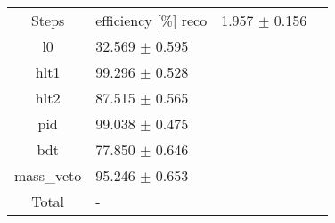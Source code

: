 \begin{table} 
\centering 
\begin{tabular}{clll} 
\toprule[1pt] 
Steps  & efficiency [\%]  \midrule[1pt] 
reco& 1.957 $\pm$ 0.156\\ 
l0& 32.569 $\pm$ 0.595\\ 
hlt1& 99.296 $\pm$ 0.528\\ 
hlt2& 87.515 $\pm$ 0.565\\ 
pid& 99.038 $\pm$ 0.475\\ 
bdt& 77.850 $\pm$ 0.646\\ 
mass_veto& 95.246 $\pm$ 0.653\\ 
\midrule[1pt] 
Total & -\bottomrule[1pt] 
\end{tabular} 
\end{table}